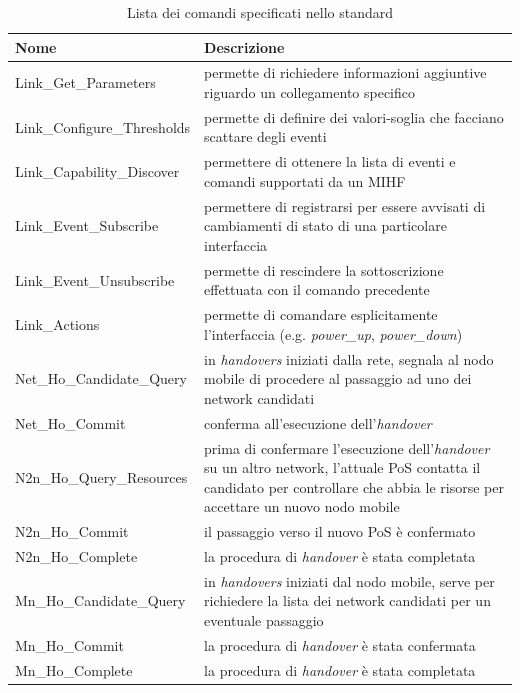 \begin{table}[h]
\begin{tabular}{p{}|p{}}
\toprule
\textbf{Nome} & \textbf{Descrizione} \\
\midrule
Link\_Get\_Parameters & permette di richiedere informazioni aggiuntive riguardo un collegamento specifico \\
\hline
Link\_Configure\_Thresholds & permette di definire dei valori-soglia che facciano scattare degli eventi  \\
\hline
Link\_Capability\_Discover & permettere di ottenere la lista di eventi e comandi supportati da un MIHF  \\
\hline
Link\_Event\_Subscribe & permettere di registrarsi per essere avvisati di cambiamenti di stato di una particolare interfaccia\\
\hline
Link\_Event\_Unsubscribe & permette di rescindere la sottoscrizione effettuata con il comando precedente\\
\hline
Link\_Actions & permette di comandare esplicitamente l'interfaccia (e.g. {\em power\_up}, {\em power\_down}) \\
\hline
Net\_Ho\_Candidate\_Query & in {\em handovers} iniziati dalla rete, segnala al nodo mobile di procedere al passaggio ad uno dei network candidati \\
\hline
Net\_Ho\_Commit & conferma all'esecuzione dell'{\em handover} \\
\hline
N2n\_Ho\_Query\_Resources & prima di confermare l'esecuzione dell'{\em handover} su un altro network, l'attuale PoS contatta il candidato per controllare che abbia le risorse per accettare un nuovo nodo mobile \\
\hline
N2n\_Ho\_Commit & il passaggio verso il nuovo PoS è confermato\\
\hline
N2n\_Ho\_Complete & la procedura di {\em handover} è stata completata \\
\hline
Mn\_Ho\_Candidate\_Query & in {\em handovers} iniziati dal nodo mobile, serve per richiedere la lista dei network candidati per un eventuale passaggio \\
\hline
Mn\_Ho\_Commit & la procedura di {\em handover} è stata confermata \\
\hline
Mn\_Ho\_Complete & la procedura di {\em handover} è stata completata \\
\bottomrule
\end{tabular}
\caption{Lista dei comandi specificati nello standard}
\label{mihcommands}
\end{table}

